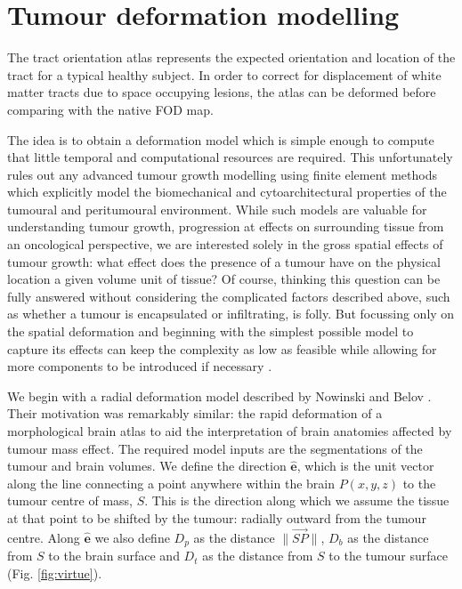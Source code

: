 \section{Tumour deformation modelling}
\label{chapterlabel3}

The tract orientation atlas represents the expected orientation and location of the tract for a typical healthy subject.
In order to correct for displacement of white matter tracts due to space occupying lesions, the atlas can be deformed before comparing with the native FOD map.

The idea is to obtain a deformation model which is simple enough to compute that little temporal and computational resources are required.
This unfortunately rules out any advanced tumour growth modelling using finite element methods which explicitly model the biomechanical and cytoarchitectural  properties of the tumoural and peritumoural environment.
While such models are valuable for understanding tumour growth, progression at effects on surrounding tissue from an oncological perspective, we are interested solely in the gross spatial effects of tumour growth: what effect does the presence of a tumour have on the physical location a given volume unit of tissue?
Of course, thinking this question can be fully answered without considering the complicated factors described above, such as whether a tumour is encapsulated or infiltrating, is folly.
But focussing only on the spatial deformation and beginning with the simplest possible model to capture its effects can keep the complexity as low as feasible while allowing for more components to be introduced if necessary .

We begin with a radial deformation model described by Nowinski and Belov \citep{Nowinski2005}.
Their motivation was remarkably similar: the rapid deformation of a morphological brain atlas to aid the interpretation of brain anatomies affected by tumour mass effect.
The required model inputs are the segmentations of the tumour and brain volumes.
We define the direction $\mathbf{\hat{e}}$, which is the unit vector along the line connecting a point anywhere within the brain $P(x,y,z)$ to the tumour centre of mass, $S$.
This is the direction along which we assume the tissue at that point to be shifted by the tumour: radially outward from the tumour centre.
Along $\mathbf{\hat{e}}$ we also define $D_p$ as the distance  $\|\overrightarrow{SP}\|$, $D_b$ as the distance from $S$ to the brain surface and $D_t$ as the distance from $S$ to the tumour surface (Fig. \ref{fig:virtue}).

